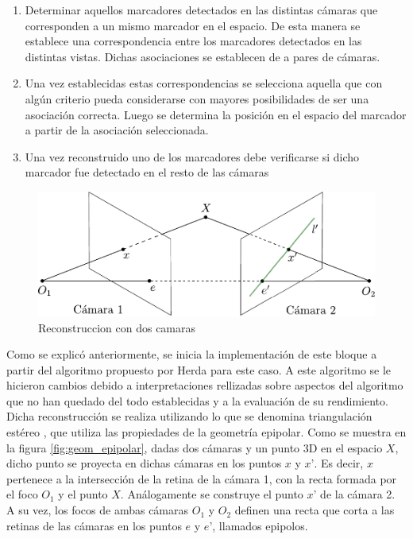 \begin{enumerate}
\item Determinar  aquellos marcadores detectados en las distintas cámaras que corresponden a un mismo marcador en el espacio. De esta manera se establece una correspondencia entre los marcadores detectados en las distintas vistas. Dichas asociaciones se establecen de a pares de cámaras.
\item Una vez establecidas estas correspondencias se selecciona aquella que con algún criterio pueda considerarse con mayores posibilidades de ser una asociación correcta. Luego se determina la posición en el espacio del marcador a partir de la asociación seleccionada.

\item Una vez reconstruido uno de los marcadores debe verificarse si dicho marcador fue detectado en el resto de las cámaras
\end{enumerate}

\begin{figure}[h!]
\begin{center}
\includegraphics[scale=0.7]{img/Reconstruccion/geometria_epipolar.pdf}
\end{center}
\caption{Reconstruccion con dos camaras}
\label{fig: geometria_epipolar}
\end{figure}

Como se explicó anteriormente, se inicia la implementación de este bloque a partir del algoritmo propuesto por Herda \cite{Herda} para este caso. A este algoritmo se le hicieron cambios debido a interpretaciones rellizadas sobre aspectos del algoritmo que no han quedado del todo establecidas y a la evaluación de su rendimiento.\\



Dicha reconstrucción se realiza utilizando lo que se denomina triangulación estéreo \cite{Faugueras}, que utiliza las propiedades de la geometría epipolar. Como se muestra en la figura \ref{fig:geom_epipolar}, dadas dos cámaras y un punto 3D en el espacio \(X\), dicho punto se proyecta en dichas cámaras en los puntos \(x\) y \(x’\). Es decir, \(x\) pertenece a la intersección de la retina de la cámara 1, con la recta formada por el foco \(O_1\) y el punto \(X\). Análogamente se construye el punto \(x’\) de la cámara 2. A su vez, los focos de ambas cámaras \(O_1\) y \(O_2\) definen una recta  que corta a las retinas de las cámaras en los puntos \(e\) y \(e’\), llamados epipolos.

